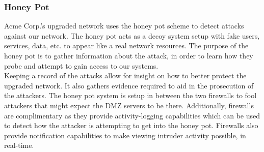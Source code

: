 \begin{center}
\vspace{2.5em}



\end{center}

\subsubsection{Honey Pot}
Acme Corp.'s upgraded network uses the honey pot scheme to detect attacks 
against our network. The honey pot acts as a decoy system setup with fake 
users, services, data, etc. to appear like a real network resources. The purpose
of the honey pot is to gather information about the attack, in order to
learn how they probe and attempt to gain access to our systems. \\

\noindent
Keeping a record of the attacks allow for insight on how to better protect the
upgraded network. It also gathers evidence required to aid in the prosecution 
of the attackers. The honey pot system is setup in between the two firewalls 
to fool attackers that might expect the DMZ servers to be there. Additionally, 
firewalls are complimentary as they provide activity-logging capabilities 
which can be used to detect how the attacker is attempting to get into the 
honey pot. Firewalls also provide notification capabilities to make viewing 
intruder activity possible, in real-time.

